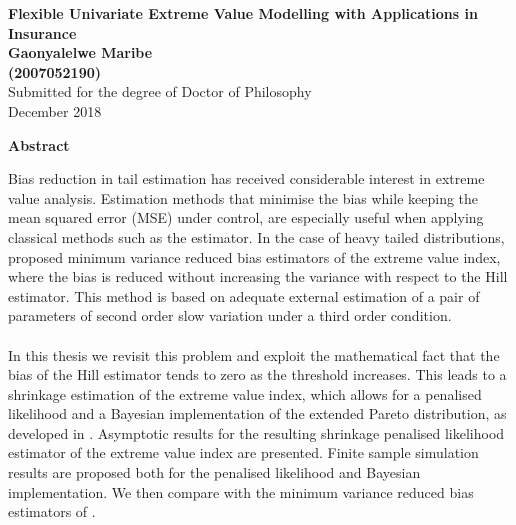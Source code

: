 \newpage
\thispagestyle{empty}
\begin{center}
 {\Large \bf Flexible Univariate Extreme Value Modelling with Applications in Insurance}\\
  \vspace*{1cm}
  \textbf{\large Gaonyalelwe Maribe\\(2007052190)}\\
  \vspace*{0.5cm}
  {\large Submitted for the degree of Doctor of Philosophy\\ December 2018}

  \vspace*{1cm}
  \textbf{\large Abstract}\\
    
\end{center}
Bias reduction in tail estimation has received considerable interest in extreme value analysis. Estimation methods that minimise the bias while keeping the mean squared error (MSE) under control, are especially useful when applying classical methods such as the \cite{hill1975simple} estimator. In the case of heavy tailed distributions, \cite{caeiro2005direct} proposed minimum variance reduced bias estimators of the extreme value index, where the bias is reduced without increasing the variance with respect to the Hill estimator. This method is based on adequate external estimation of a pair of parameters of second order slow variation under a third order condition. 
\\\\
In this thesis we revisit this problem and exploit the mathematical fact that the bias of the Hill estimator tends to zero as the threshold increases. This leads to a shrinkage estimation of the extreme value index, which allows for a penalised likelihood and a Bayesian implementation of the extended Pareto distribution, as developed in \cite{beirlant2009second}. Asymptotic results for the resulting shrinkage penalised likelihood estimator of the extreme value index are presented. Finite sample simulation results are proposed both for the penalised likelihood and Bayesian implementation. We then compare with the minimum variance reduced bias estimators of \cite{caeiro2005direct}.
\\\\
